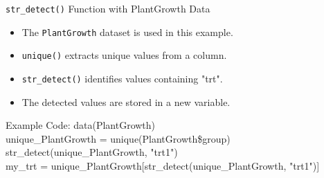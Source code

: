 \documentclass{beamer}
\begin{document}
\begin{frame}{\texttt{str\_detect()} Function with PlantGrowth Data}
    \begin{itemize}
        \item The \texttt{PlantGrowth} dataset is used in this example.
        \item \texttt{unique()} extracts unique values from a column.
        \item \texttt{str\_detect()} identifies values containing "trt".
        \item The detected values are stored in a new variable.
    \end{itemize}

    
    \begin{block}{Example Code:}
     \quad data(PlantGrowth)\\
\quad unique\_PlantGrowth = unique(PlantGrowth\$group)\\
\quad str\_detect(unique\_PlantGrowth, "trt1")\\
\quad my\_trt = unique\_PlantGrowth[str\_detect(unique\_PlantGrowth, "trt1")] 
    \end{block}


\end{frame}
\end{document}
